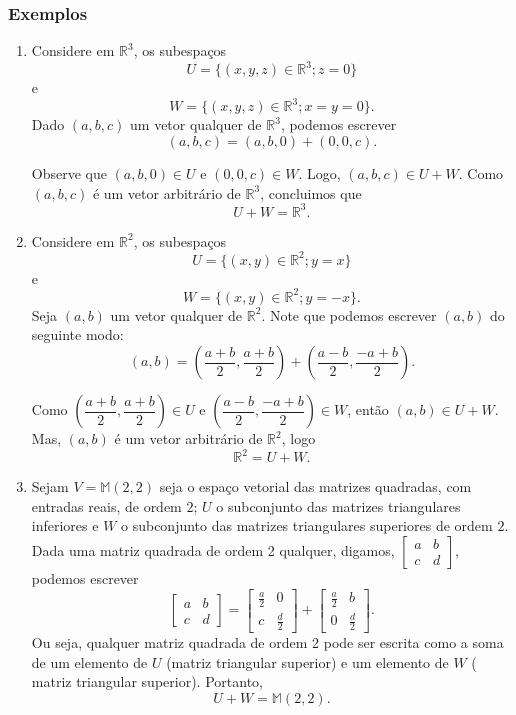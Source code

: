 \subsubsection{\textbf{Exemplos}}
\begin{enumerate}
\item Considere em  $\mathbb{R}^3$, os subespaços
$$ U= \{(x,y,z) \in \mathbb{R}^3 ; z=0\} $$ e  $$ W= \{(x,y,z) \in \mathbb{R}^3 ; x=y=0\}.  $$ Dado   $(a, b, c)$ um vetor qualquer de $\mathbb{R}^3$, podemos escrever
$$(a, b, c)= (a,b,0)+(0,0,c).$$

 Observe que  $(a, b,0 ) \in U$ e  $(0, 0, c) \in W$. Logo, $(a,b,c) \in U+W$.  Como $(a,b,c)$ é um vetor arbitrário de $\mathbb{R}^3$, concluimos que $$U+W=\mathbb{R}^3.$$


\item Considere em $\mathbb{R}^2$, os subespaços
$$ U= \{(x,y) \in \mathbb{R}^2 ; y=x\} $$ e  $$ W= \{(x,y) \in \mathbb{R}^2 ; y=-x\}.  $$ Seja $(a, b)$ um vetor qualquer de $\mathbb{R}^2$.  Note que  podemos escrever
$(a, b)$ do seguinte modo: $$(a,b)=\left(\dfrac{a+b}{2},\dfrac{a+b}{2}   \right)+\left(\dfrac{a-b}{2},\dfrac{-a+b}{2}   \right).$$

Como $\left(\dfrac{a+b}{2},\dfrac{a+b}{2}   \right) \in U$ e $\left(\dfrac{a-b}{2},\dfrac{-a+b}{2}   \right) \in W$, então $(a,b) \in U+W$.  Mas, $(a,b)$ é um vetor arbitrário de $\mathbb{R}^2$, logo $$\mathbb{R}^2 = U+W.$$



\item  Sejam $V= \mathbb{M}(2,2)$ seja o espaço vetorial  das matrizes quadradas, com entradas reais,  de ordem $2$; $U$ o subconjunto  das matrizes triangulares inferiores e $W$ o subconjunto das matrizes triangulares superiores de ordem $2$. Dada  uma matriz  quadrada de ordem 2  qualquer, digamos, $\begin{bmatrix} a & b \\ c & d\end{bmatrix}$, podemos escrever
$$\begin{bmatrix} a & b \\ c & d\end{bmatrix}= \begin{bmatrix} \frac{a}{2} & 0\\ c & \frac{d}{2}\end{bmatrix}+ \begin{bmatrix} \frac{a}{2} & b \\ 0 & \frac{d}{2}\end{bmatrix}.$$
Ou seja, qualquer matriz quadrada de ordem 2 pode ser escrita como a soma de um elemento de $U$ (matriz triangular superior) e um elemento de $W$ ( matriz triangular superior). Portanto, $$ U+W=\mathbb{M}(2,2).$$

\end{enumerate}




